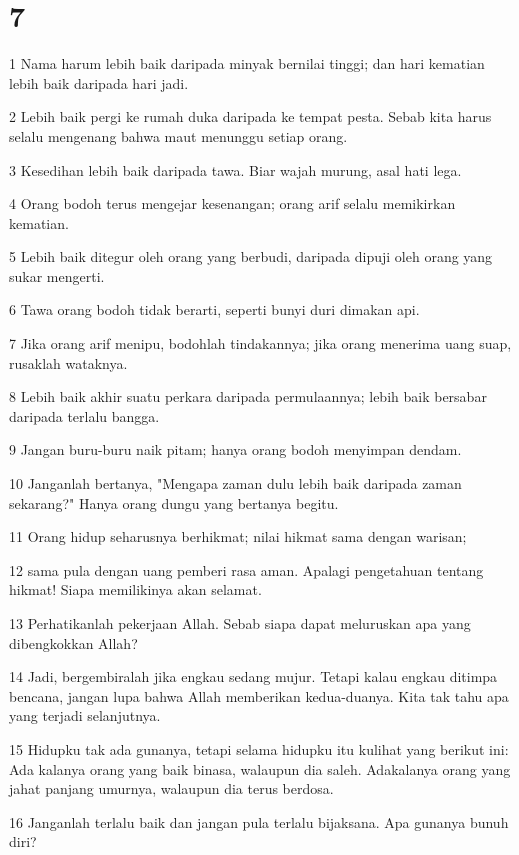 \chapter{7}

\par 1 Nama harum lebih baik daripada minyak bernilai tinggi; dan hari kematian lebih baik daripada hari jadi.
\par 2 Lebih baik pergi ke rumah duka daripada ke tempat pesta. Sebab kita harus selalu mengenang bahwa maut menunggu setiap orang.
\par 3 Kesedihan lebih baik daripada tawa. Biar wajah murung, asal hati lega.
\par 4 Orang bodoh terus mengejar kesenangan; orang arif selalu memikirkan kematian.
\par 5 Lebih baik ditegur oleh orang yang berbudi, daripada dipuji oleh orang yang sukar mengerti.
\par 6 Tawa orang bodoh tidak berarti, seperti bunyi duri dimakan api.
\par 7 Jika orang arif menipu, bodohlah tindakannya; jika orang menerima uang suap, rusaklah wataknya.
\par 8 Lebih baik akhir suatu perkara daripada permulaannya; lebih baik bersabar daripada terlalu bangga.
\par 9 Jangan buru-buru naik pitam; hanya orang bodoh menyimpan dendam.
\par 10 Janganlah bertanya, "Mengapa zaman dulu lebih baik daripada zaman sekarang?" Hanya orang dungu yang bertanya begitu.
\par 11 Orang hidup seharusnya berhikmat; nilai hikmat sama dengan warisan;
\par 12 sama pula dengan uang pemberi rasa aman. Apalagi pengetahuan tentang hikmat! Siapa memilikinya akan selamat.
\par 13 Perhatikanlah pekerjaan Allah. Sebab siapa dapat meluruskan apa yang dibengkokkan Allah?
\par 14 Jadi, bergembiralah jika engkau sedang mujur. Tetapi kalau engkau ditimpa bencana, jangan lupa bahwa Allah memberikan kedua-duanya. Kita tak tahu apa yang terjadi selanjutnya.
\par 15 Hidupku tak ada gunanya, tetapi selama hidupku itu kulihat yang berikut ini: Ada kalanya orang yang baik binasa, walaupun dia saleh. Adakalanya orang yang jahat panjang umurnya, walaupun dia terus berdosa.
\par 16 Janganlah terlalu baik dan jangan pula terlalu bijaksana. Apa gunanya bunuh diri?
